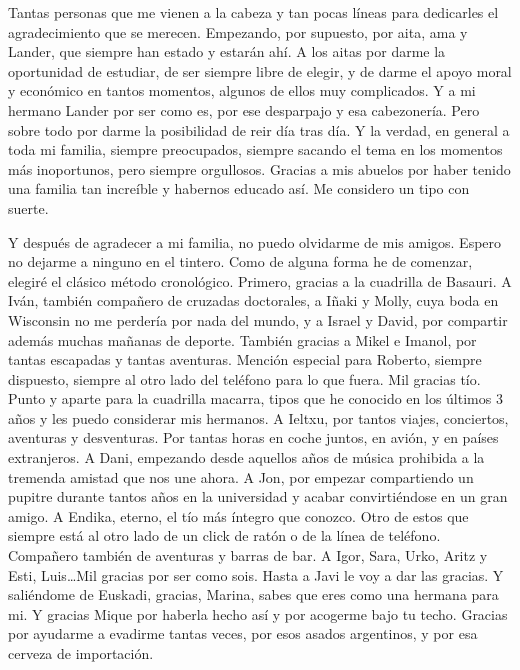 
\begin{acknowledgementslong} 

Tantas personas que me vienen a la cabeza y tan pocas líneas para dedicarles
el agradecimiento que se merecen. Empezando, por supuesto, por aita, ama y Lander,
que siempre han estado y estarán ahí. A los aitas por darme la oportunidad de 
estudiar, de ser siempre libre de elegir, y de darme el apoyo moral y económico 
en tantos momentos, algunos de ellos muy complicados. Y a mi hermano Lander por 
ser como es, por ese desparpajo y esa cabezonería. Pero sobre todo por darme la 
posibilidad de reir día tras día. Y la verdad, en general a toda mi familia, 
siempre preocupados, siempre sacando el tema en los momentos más inoportunos, 
pero siempre orgullosos. Gracias a mis abuelos por haber tenido una familia tan 
increíble y habernos educado así. Me considero un tipo con suerte.

Y después de agradecer a mi familia, no puedo olvidarme de mis amigos. Espero
no dejarme a ninguno en el tintero. Como de alguna forma he de comenzar, elegiré 
el clásico método cronológico. Primero, gracias a la cuadrilla de Basauri. A Iván,
también compañero de cruzadas doctorales, a Iñaki y Molly, cuya boda en Wisconsin
no me perdería por nada del mundo, y a Israel y David, por compartir además muchas
mañanas de deporte. También gracias a Mikel e Imanol, por tantas escapadas y 
tantas aventuras. Mención especial para Roberto, siempre dispuesto, siempre al 
otro lado del teléfono para lo que fuera. Mil gracias tío. Punto y aparte para
la cuadrilla macarra, tipos que he conocido en los últimos 3 años y les puedo
considerar mis hermanos. A Ieltxu, por tantos viajes, conciertos, aventuras y 
desventuras. Por tantas horas en coche juntos, en avión, y en países extranjeros.
A Dani, empezando desde aquellos años de música prohibida a la tremenda 
amistad que nos une ahora. A Jon, por empezar compartiendo un pupitre durante 
tantos años en la universidad y acabar convirtiéndose en un gran amigo. A Endika, 
eterno, el tío más íntegro que conozco. Otro de estos que siempre está al otro lado
de un click de ratón o de la línea de teléfono. Compañero también de aventuras y 
barras de bar. A Igor, Sara, Urko, Aritz y Esti, Luis\dots Mil gracias por ser 
como sois. Hasta a Javi le voy a dar las gracias. Y saliéndome de Euskadi, 
gracias, Marina, sabes que eres como una hermana para mi. Y gracias Mique por 
haberla hecho así y por acogerme bajo tu techo. Gracias por ayudarme a evadirme 
tantas veces, por esos asados argentinos, y por esa cerveza de importación.


\end{acknowledgementslong}
